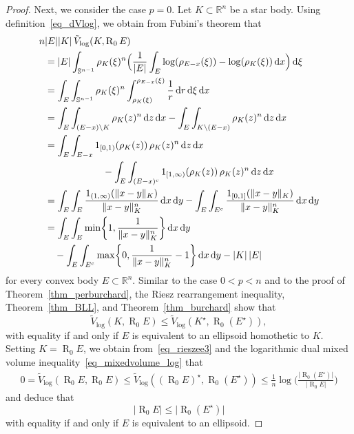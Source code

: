 \documentclass{amsart}
\newcommand{\omr}[1]{\operatorname{R}_{#1}}
\newcommand{\snvtex}{{\mathbb S}^{n-1}}
\newcommand{\dVlog}{\tilde V_{\log}}
\newcommand{\dvtex}{\,\mathrm{d}}
\newcommand{\vol}[1]{ \vert #1\vert}
\renewcommand{\chi}{\operatorname{1}}
\begin{document}
\begin{proof}
Next, we consider the case $p=0$. Let $K\subset \mathbb R^{n}$ be a star
body. Using definition~\eqref{eq_dVlog}, we obtain from Fubini's theorem
that
%
\begin{align}
n &\vol{E}\vol{K}\, \dVlog (K,\omr0 E)
\nonumber \\
&= \vol{E}\int _{\snvtex} \rho _{K}(\xi )^{n}\Big(\frac {1}{\vol{E}}
\int _{E} \log (\rho _{E-x}(\xi )) - \log (\rho _{K}(\xi )) \dvtex x\Big)
\dvtex \xi
\nonumber \\
&= \int _{E} \int _{\snvtex} \rho _{K}(\xi )^{n} \int _{\rho _{K}(\xi )}^{
\rho _{E-x}(\xi )} \frac {1}{r} \dvtex r \dvtex \xi \dvtex x
\nonumber \\
&= \int _{E} \int _{(E-x) \setminus K} \rho _{K}(z)^{n} \dvtex z \dvtex x-
\int _{E} \int _{K \setminus (E-x)} \rho _{K}(z)^{n} \dvtex z \dvtex x
\nonumber \\
&=\int _{E} \int _{E-x} \chi _{[0,1)}(\rho _{K}(z))\,\rho _{K}(z)^{n}
\dvtex z \dvtex x
\nonumber \\
&
\hskip 60pt
- \int _{E} \int _{(E-x)^{c}} \chi _{[1,\infty )}(\rho _{K}(z))\,
\rho _{K}(z)^{n} \dvtex z \dvtex x
\nonumber \\
&=\int _{E}\int _{E}
\frac{\chi _{(1,\infty )}(\|x-y\|_{K}) }{\|x-y\|_{K}^{n}} \dvtex x\dvtex y -
\int _{E}\int _{E^{c}}
\frac{\chi _{[0,1]}(\|x-y\|_{K})}{\|x-y\|_{K}^{n}}\dvtex x\dvtex y
\nonumber\\
&=\int_E\int_E \min\biggl\{1, \frac1{\|x-y\|_K^{n}}\biggr\} \dvtex x\dvtex y
\nonumber \\
&\quad {} - \int_E\int_{E^c} \max \biggl\{0, \frac1{\|x-y\|_K^{n}}-1\biggr\}\dvtex x\dvtex y -\vol{K}\,\vol{E}
\nonumber
\end{align}
%
for every convex body $E\subset \mathbb R^{n}$. Similar to the case
$0<p<n$ and to the proof of Theorem~\ref{thm_perburchard}, the Riesz rearrangement
inequality, Theorem~\ref{thm_BLL}, and Theorem~\ref{thm_burchard} show
that
%
\begin{equation}
\label{eq_rieszee3}
\dVlog (K,\omr0 E) \leq \dVlog (K^{\star},\omr 0 (E^{\star})),
\end{equation}
%
with equality if and only if $E$ is equivalent to an ellipsoid homothetic
to $K$. Setting $K=\omr 0 E$, we obtain from~\eqref{eq_rieszee3} and the
logarithmic dual mixed volume inequality~\eqref{eq_mixedvolume_log} that
%
\begin{align}
0 = \dVlog (\omr0 E,\omr0 E) \leq \dVlog ((\omr0 E)^{\star},\omr0 (E^{
\star})) \leq%
\frac {1}{n} \log \Big(\frac{\vol{\omr0(E^{\star})}}{\vol{\omr0E}}
\Big)
\nonumber \end{align}
%
and deduce that
%
\begin{equation}
\label{eq_dmv3}
\vol{\omr0 E} \leq \vol{\omr0(E^{\star})}
\end{equation}
%
with equality if and only if $E$ is equivalent to an ellipsoid.


\end{proof}
\end{document}
